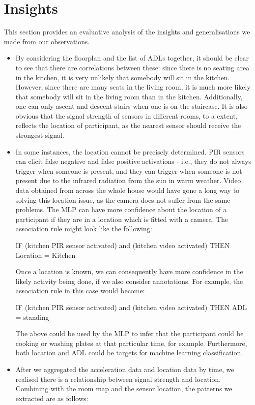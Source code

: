\documentclass[fleqn,10pt]{SelfArx} %
\begin{document}
	\section{Insights}
This section provides an evaluative analysis of the insights and generalisations we made from our observations. 
\begin{itemize}
\item By considering the floorplan and the list of ADLs together, it should be clear to see that there are correlations between these: since there is no seating area in the kitchen, it is very unlikely that somebody will sit in the kitchen. However, since there are many seats in the living room, it is much more likely that somebody will sit in the living room than in the kitchen. Additionally, one can only ascent and descent stairs when one is on the staircase. It is also obvious that the signal strength of sensors in different rooms, to a extent, reflects the location of participant, as the nearest sensor should receive the strongest signal.
\item In some instances, the location cannot be precisely determined. PIR sensors can elicit false negative and false positive activations - i.e., they do not always trigger when someone is present, and they can trigger when someone is not present due to the infrared radiation from the sun in warm weather. Video data obtained from across the whole house would have gone a long way to solving this location issue, as the camera does not suffer from the same problems. The MLP can have more confidence about the location of a participant if they are in a location which is fitted with a camera. The association rule might look like the following:

IF (kitchen PIR sensor activated) and (kitchen video activated) THEN Location = Kitchen

Once a location is known, we can consequently have more confidence in the likely activity being done, if we also consider annotations. For example, the association rule in this case would become:

IF (kitchen PIR sensor activated) and (kitchen video activated) THEN ADL = standing

The above could be used by the MLP to infer that the participant could be cooking or washing plates at that particular time, for example. Furthermore, both location and ADL could be targets for machine learning classification.
\item After we aggregated the acceleration data and location data by time, we realised there is a relationship between signal strength and location. Combining with the room map and the sensor location, the patterns we extracted are as follows:


\end{itemize}
\end{document}
